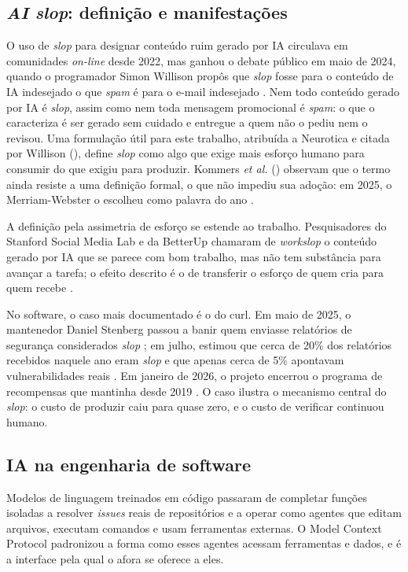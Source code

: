 \documentclass[a4paper,12pt]{article}
\newcommand{\estr}[1]{\textit{#1}}
\begin{document}
\subsection{\textit{AI slop}: definição e manifestações}\label{sec:slop}

O uso de \estr{slop} para designar conteúdo ruim gerado por IA circulava em comunidades \estr{on-line} desde 2022, mas ganhou o debate público em maio de 2024, quando o programador Simon Willison propôs que \estr{slop} fosse para o conteúdo de IA indesejado o que \estr{spam} é para o e-mail indesejado \citep{willison2024}. Nem todo conteúdo gerado por IA é \estr{slop}, assim como nem toda mensagem promocional é \estr{spam}: o que o caracteriza é ser gerado sem cuidado e entregue a quem não o pediu nem o revisou. Uma formulação útil para este trabalho, atribuída a Neurotica e citada por Willison (\citeyear{willison2026}), define \estr{slop} como algo que exige mais esforço humano para consumir do que exigiu para produzir. Kommers \textit{et al.} (\citeyear{kommers2026}) observam que o termo ainda resiste a uma definição formal, o que não impediu sua adoção: em 2025, o Merriam-Webster o escolheu como palavra do ano \citep{merriam2025}.

A definição pela assimetria de esforço se estende ao trabalho. Pesquisadores do Stanford Social Media Lab e da BetterUp chamaram de \estr{workslop} o conteúdo gerado por IA que se parece com bom trabalho, mas não tem substância para avançar a tarefa; o efeito descrito é o de transferir o esforço de quem cria para quem recebe \citep{niederhoffer2025}.

No software, o caso mais documentado é o do curl. Em maio de 2025, o mantenedor Daniel Stenberg passou a banir quem enviasse relatórios de segurança considerados \estr{slop} \citep{newstack2026}; em julho, estimou que cerca de 20\% dos relatórios recebidos naquele ano eram \estr{slop} e que apenas cerca de 5\% apontavam vulnerabilidades reais \citep{stenberg2025}. Em janeiro de 2026, o projeto encerrou o programa de recompensas que mantinha desde 2019 \citep{stenberg2026}. O caso ilustra o mecanismo central do \estr{slop}: o custo de produzir caiu para quase zero, e o custo de verificar continuou humano.

\subsection{IA na engenharia de software}

Modelos de linguagem treinados em código passaram de completar funções isoladas \citep{chen2021} a resolver \estr{issues} reais de repositórios \citep{jimenez2024} e a operar como agentes que editam arquivos, executam comandos e usam ferramentas externas. O Model Context Protocol \citep{anthropic2024} padronizou a forma como esses agentes acessam ferramentas e dados, e é a interface pela qual o afora se oferece a eles.
\end{document}
